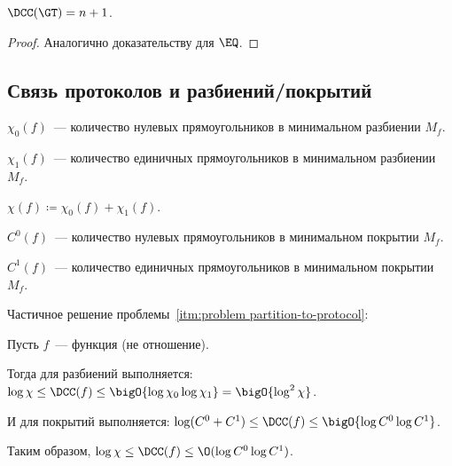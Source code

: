 \begin{theorem}
    $\DCC(\GT) = n + 1$.
\end{theorem}

\begin{proof}
    Аналогично доказательству для $\EQ$.
\end{proof}


\subsection{Связь протоколов и разбиений/покрытий}

\begin{definition}
    $\chi_0(f)$~--- количество нулевых прямоугольников в минимальном разбиении $M_f$.

    $\chi_1(f)$~--- количество единичных прямоугольников в минимальном разбиении $M_f$.

    $\chi(f) \coloneqq  \chi_0(f) + \chi_1(f)$.
\end{definition}

\begin{definition}
    $C^0(f)$~--- количество нулевых прямоугольников в минимальном покрытии $M_f$.

    $C^1(f)$~--- количество единичных прямоугольников в минимальном покрытии $M_f$.
\end{definition}

Частичное решение проблемы~\ref{itm:problem partition-to-protocol}:
\begin{theorem}
    \label{D < log C0 * log C1}

    Пусть $f$~--- функция (не отношение).

    Тогда для разбиений выполняется:
    $\log \chi \le \DCC(f) \le \bigO{\log \chi_0 \log \chi_1} = \bigO{\log^2 \chi}$.

    И для покрытий выполняется:
    $\log (C^0 + C^1) \le \DCC(f) \le \bigO{\log C^0 \log C^1}$.

    Таким образом, $\log \chi \le \DCC(f) \le \O(\log C^0 \log C^1)$.
\end{theorem}



